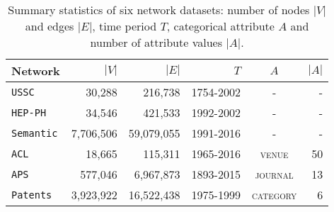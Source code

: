 \begin{table}[b]
 {
  \begin{tabular}[c]{lrrrcr} \toprule
   Network & $|V|$           & $|E|$        & $T$        & $A$              & $|A|$ \\ \midrule
   \texttt{USSC}         & 30,288     & 216,738      & 1754-2002  & - & -                  \\
   \texttt{HEP-PH}       & 34,546     & 421,533      & 1992-2002  & - & -                  \\
   \texttt{Semantic}     & 7,706,506  & 59,079,055   & 1991-2016  & - & -                  \\   \midrule
   \texttt{ACL}          & 18,665     & 115,311      & 1965-2016  & \textsc{venue} & 50    \\
   \texttt{APS}          & 577,046    & 6,967,873    & 1893-2015  & \textsc{journal} & 13   \\
   \texttt{Patents}      & 3,923,922  & 16,522,438   & 1975-1999  & \textsc{category} & 6  \\
  \bottomrule
  \end{tabular}
  \vspace{1mm}
  \caption{Summary statistics of six network datasets: number of nodes $|V|$ and edges $|E|$, time period
  $T$, categorical attribute $A$ and number of attribute values $|A|$.}
  \label{table:datasets}
 }
\end{table}


